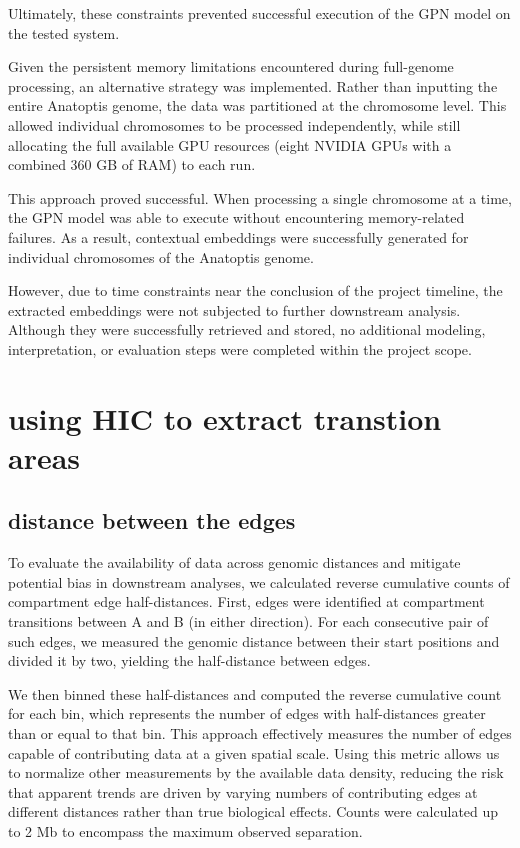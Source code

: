 \documentclass[
  a4paper,
]{scrbook}
\begin{document}
Ultimately, these constraints prevented successful execution of the GPN
model on the tested system.

Given the persistent memory limitations encountered during full-genome
processing, an alternative strategy was implemented. Rather than
inputting the entire Anatoptis genome, the data was partitioned at the
chromosome level. This allowed individual chromosomes to be processed
independently, while still allocating the full available GPU resources
(eight NVIDIA GPUs with a combined 360 GB of RAM) to each run.

This approach proved successful. When processing a single chromosome at
a time, the GPN model was able to execute without encountering
memory-related failures. As a result, contextual embeddings were
successfully generated for individual chromosomes of the Anatoptis
genome.

However, due to time constraints near the conclusion of the project
timeline, the extracted embeddings were not subjected to further
downstream analysis. Although they were successfully retrieved and
stored, no additional modeling, interpretation, or evaluation steps were
completed within the project scope.

\chapter{using HIC to extract transtion
areas}\label{using-hic-to-extract-transtion-areas}

\section{distance between the edges}\label{distance-between-the-edges}

To evaluate the availability of data across genomic distances and
mitigate potential bias in downstream analyses, we calculated reverse
cumulative counts of compartment edge half-distances. First, edges were
identified at compartment transitions between A and B (in either
direction). For each consecutive pair of such edges, we measured the
genomic distance between their start positions and divided it by two,
yielding the half-distance between edges.

We then binned these half-distances and computed the reverse cumulative
count for each bin, which represents the number of edges with
half-distances greater than or equal to that bin. This approach
effectively measures the number of edges capable of contributing data at
a given spatial scale. Using this metric allows us to normalize other
measurements by the available data density, reducing the risk that
apparent trends are driven by varying numbers of contributing edges at
different distances rather than true biological effects. Counts were
calculated up to 2 Mb to encompass the maximum observed separation.
\end{document}
